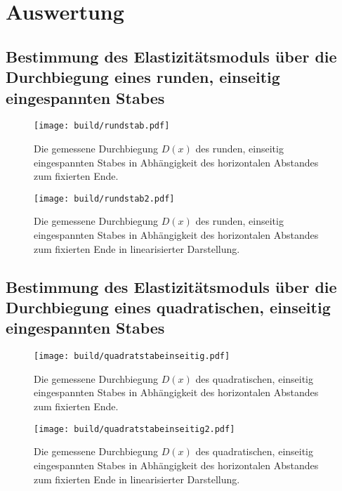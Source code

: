 
\section{Auswertung}
\label{sec:Auswertung}


\subsection{Bestimmung des Elastizitätsmoduls über die Durchbiegung eines runden, einseitig eingespannten Stabes}
\begin{figure}
	\centering
	\caption{Die gemessene Durchbiegung $D(x)$ des runden, einseitig eingespannten Stabes
	 in Abhängigkeit des horizontalen Abstandes zum fixierten Ende.}
	\texttt{[image: build/rundstab.pdf]}
	\label{fig:grad3}
\end{figure}
\begin{figure}
	\centering
	\caption{Die gemessene Durchbiegung $D(x)$ des runden, einseitig eingespannten Stabes
	 in Abhängigkeit des horizontalen Abstandes zum fixierten Ende in linearisierter Darstellung.}
	\texttt{[image: build/rundstab2.pdf]}
	\label{fig:grad3}
\end{figure}



\subsection{Bestimmung des Elastizitätsmoduls über die Durchbiegung eines quadratischen, einseitig eingespannten Stabes}
\begin{figure}
	\centering
	\caption{Die gemessene Durchbiegung $D(x)$ des quadratischen, einseitig eingespannten Stabes
	 in Abhängigkeit des horizontalen Abstandes zum fixierten Ende.}
	\texttt{[image: build/quadratstabeinseitig.pdf]}
	\label{fig:grad3}
\end{figure}
\begin{figure}
	\centering
	\caption{Die gemessene Durchbiegung $D(x)$ des quadratischen, einseitig eingespannten Stabes
	 in Abhängigkeit des horizontalen Abstandes zum fixierten Ende in linearisierter Darstellung.}
	\texttt{[image: build/quadratstabeinseitig2.pdf]}
	\label{fig:grad3}
\end{figure}



